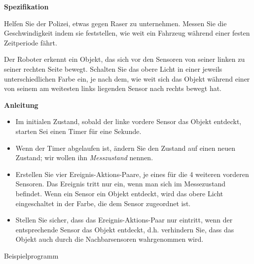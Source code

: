 \label{ch.radar}

\textbf{Spezifikation}

Helfen Sie der Polizei, etwas gegen Raser zu unternehmen. Messen Sie die Geschwindigkeit indem sie feststellen, wie weit ein Fahrzeug während einer festen Zeitperiode fährt.

Der Roboter erkennt ein Objekt, das sich vor den Sensoren von seiner linken zu seiner rechten Seite bewegt. Schalten Sie das obere Licht in einer jeweils unterschiedlichen Farbe ein, je nach dem, wie weit sich das Objekt während einer von seinem am weitesten links liegenden Sensor nach rechts bewegt hat. 

\textbf{Anleitung}

\begin{itemize}
\item Im initialen Zustand, sobald der linke vordere Sensor das Objekt entdeckt, starten Sei einen Timer für eine Sekunde. 

\item Wenn der Timer abgelaufen ist, ändern Sie den Zustand auf einen neuen Zustand; wir wollen ihn \emph{Messzustand} nennen. 

\item Erstellen Sie vier Ereignis-Aktions-Paare, je eines für die 4 weiteren vorderen Sensoren. Das Ereignis tritt nur ein, wenn man sich im Messezustand befindet. Wenn ein Sensor ein Objekt entdeckt, wird das obere Licht eingeschaltet in der Farbe, die dem Sensor zugeordnet ist.

\item Stellen Sie sicher, dass das Ereignis-Aktions-Paar nur eintritt, wenn der entsprechende Sensor das Objekt entdeckt, d.h. verhindern Sie, dass das Objekt auch durch die Nachbarsensoren wahrgenommen wird. 

\end{itemize}

\bigskip

{\raggedleft \hfill Beispielprogramm }
